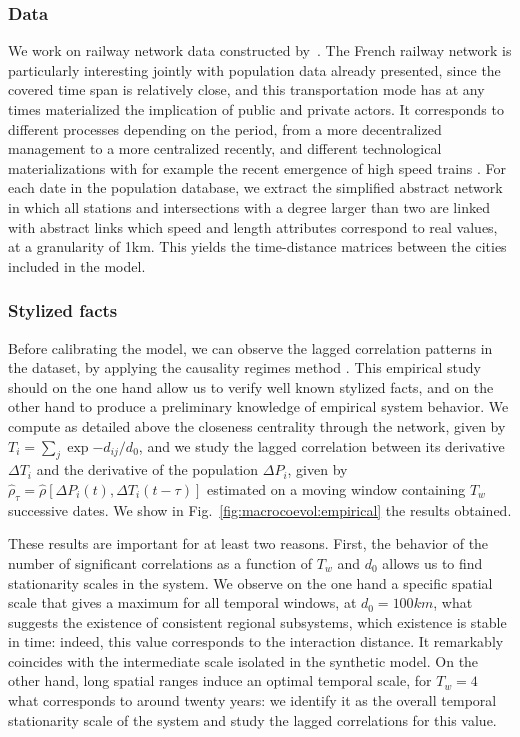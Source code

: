 \documentclass[11pt]{article}
\begin{document}
\subsubsection{Data}

We work on railway network data constructed by~\cite{thevenin2013mapping}. The French railway network is particularly interesting jointly with population data already presented, since the covered time span is relatively close, and this transportation mode has at any times materialized the implication of public and private actors. It corresponds to different processes depending on the period, from a more decentralized management to a more centralized recently, and different technological materializations with for example the recent emergence of high speed trains \citep{zembri1997fondements}. For each date in the population database, we extract the simplified abstract network in which all stations and intersections with a degree larger than two are linked with abstract links which speed and length attributes correspond to real values, at a granularity of 1km. This yields the time-distance matrices between the cities included in the model.



\subsubsection{Stylized facts}


Before calibrating the model, we can observe the lagged correlation patterns in the dataset, by applying the causality regimes method \citep{raimbault2017identification}. This empirical study should on the one hand allow us to verify well known stylized facts, and on the other hand to produce a preliminary knowledge of empirical system behavior. We compute as detailed above the closeness centrality through the network, given by $T_i = \sum_j \exp{-d_{ij}/d_0}$, and we study the lagged correlation between its derivative $\Delta T_i$ and the derivative of the population $\Delta P_i$, given by $\hat{\rho}_{\tau} = \hat{\rho}\left[\Delta P_i(t),\Delta T_i(t-\tau)\right]$ estimated on a moving window containing $T_w$ successive dates. We show in Fig.~\ref{fig:macrocoevol:empirical} the results obtained.


These results are important for at least two reasons. First, the behavior of the number of significant correlations as a function of $T_w$ and $d_0$ allows us to find stationarity scales in the system. We observe on the one hand a specific spatial scale that gives a maximum for all temporal windows, at $d_0 = 100km$, what suggests the existence of consistent regional subsystems, which existence is stable in time: indeed, this value corresponds to the interaction distance. It remarkably coincides with the intermediate scale isolated in the synthetic model. On the other hand, long spatial ranges induce an optimal temporal scale, for $T_w = 4$ what corresponds to around twenty years: we identify it as the overall temporal stationarity scale of the system and study the lagged correlations for this value.
\end{document}
